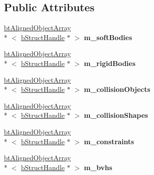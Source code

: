 \subsection*{Public Attributes}
\begin{DoxyCompactItemize}
\item 
\hypertarget{classb_parse_1_1bt_bullet_file_ac7f1c21349232f8c085b47747cc8348b}{\hyperlink{classbt_aligned_object_array}{bt\+Aligned\+Object\+Array}\\*
$<$ \hyperlink{structb_parse_1_1b_struct_handle}{b\+Struct\+Handle} $\ast$ $>$ {\bfseries m\+\_\+soft\+Bodies}}\label{classb_parse_1_1bt_bullet_file_ac7f1c21349232f8c085b47747cc8348b}

\item 
\hypertarget{classb_parse_1_1bt_bullet_file_a093d315bfd2bacca269e1e002859c483}{\hyperlink{classbt_aligned_object_array}{bt\+Aligned\+Object\+Array}\\*
$<$ \hyperlink{structb_parse_1_1b_struct_handle}{b\+Struct\+Handle} $\ast$ $>$ {\bfseries m\+\_\+rigid\+Bodies}}\label{classb_parse_1_1bt_bullet_file_a093d315bfd2bacca269e1e002859c483}

\item 
\hypertarget{classb_parse_1_1bt_bullet_file_a9db20330c3774e80e9de48caef8dc6b0}{\hyperlink{classbt_aligned_object_array}{bt\+Aligned\+Object\+Array}\\*
$<$ \hyperlink{structb_parse_1_1b_struct_handle}{b\+Struct\+Handle} $\ast$ $>$ {\bfseries m\+\_\+collision\+Objects}}\label{classb_parse_1_1bt_bullet_file_a9db20330c3774e80e9de48caef8dc6b0}

\item 
\hypertarget{classb_parse_1_1bt_bullet_file_acca9391a499c638629875ada8f145da0}{\hyperlink{classbt_aligned_object_array}{bt\+Aligned\+Object\+Array}\\*
$<$ \hyperlink{structb_parse_1_1b_struct_handle}{b\+Struct\+Handle} $\ast$ $>$ {\bfseries m\+\_\+collision\+Shapes}}\label{classb_parse_1_1bt_bullet_file_acca9391a499c638629875ada8f145da0}

\item 
\hypertarget{classb_parse_1_1bt_bullet_file_a4846363d7c7e1d3099068973baf11dd9}{\hyperlink{classbt_aligned_object_array}{bt\+Aligned\+Object\+Array}\\*
$<$ \hyperlink{structb_parse_1_1b_struct_handle}{b\+Struct\+Handle} $\ast$ $>$ {\bfseries m\+\_\+constraints}}\label{classb_parse_1_1bt_bullet_file_a4846363d7c7e1d3099068973baf11dd9}

\item 
\hypertarget{classb_parse_1_1bt_bullet_file_a34969da91c5a27783bc421779f369ee3}{\hyperlink{classbt_aligned_object_array}{bt\+Aligned\+Object\+Array}\\*
$<$ \hyperlink{structb_parse_1_1b_struct_handle}{b\+Struct\+Handle} $\ast$ $>$ {\bfseries m\+\_\+bvhs}}\label{classb_parse_1_1bt_bullet_file_a34969da91c5a27783bc421779f369ee3}


\end{DoxyCompactItemize}
